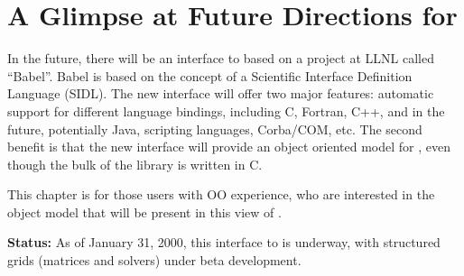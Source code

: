 
\chapter{A Glimpse at Future Directions for \hypre}

In the future, there will be an interface to \hypre{} based on
a project at LLNL called ``Babel''. 
Babel is based on the concept of a Scientific Interface
Definition Language (SIDL).
The new interface will offer two major features:
automatic support for different language bindings, including
C, Fortran, C++, and in the future, potentially Java, scripting
languages, Corba/COM, etc.
The second benefit is that the new interface will provide an
object oriented model for \hypre{}, even though the bulk of
the library is written in C.

This chapter is for those users with OO experience, who are interested
in the object model that will be present in this view of \hypre{}.

{\bf Status:} As of January 31, 2000, this interface to \hypre{}
is underway, with structured grids (matrices and solvers) under
beta development.